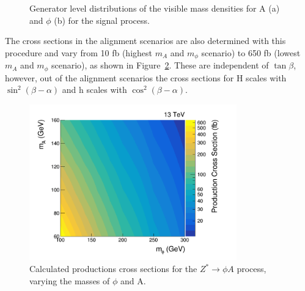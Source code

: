 \begin{figure}[!hbtp]
\centering
\caption{Generator level distributions of the visible mass densities for A (a) and $\phi$ (b) for the signal process.}
\label{fig:4tau_gen_dist}
\end{figure}

The cross sections in the alignment scenarios are also determined with this procedure and vary from 10 fb (highest $m_{A}$ and $m_{\phi}$ scenario) to 650 fb (lowest $m_{A}$ and $m_{\phi}$ scenario), as shown in Figure~\ref{fig:4tau_xs}.
These are independent of $\tan\beta$, however, out of the alignment scenarios the cross sections for H scales with $\sin^{2}(\beta-\alpha)$ and h scales with $\cos^{2}(\beta-\alpha)$. \\

\begin{figure}[!hbtp]
\centering
    \includegraphics[width=0.8\textwidth]{Figures/cross_sections.png}
\caption{Calculated productions cross sections for the $Z^{*} \rightarrow \phi A$ process, varying the masses of $\phi$ and A.}
\label{fig:4tau_xs}
\end{figure}

